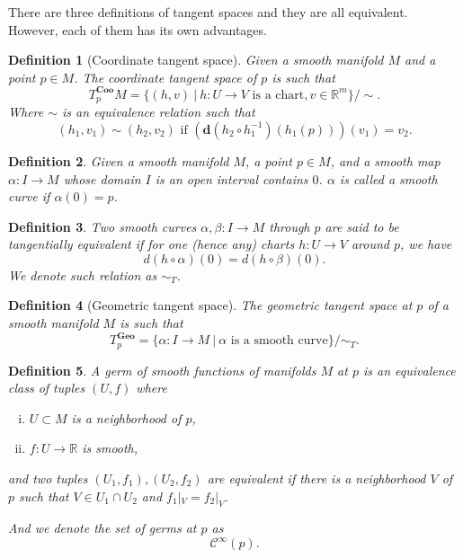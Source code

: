 \documentclass{article}
\newtheorem{definition}{Definition}[section]
\numberwithin{equation}{section}
\begin{document}
There are three definitions of tangent spaces and they are all equivalent. However, each of them has its own advantages. 

\begin{definition}[Coordinate tangent space]
Given a smooth manifold $M$ and a point $p\in M$. The coordinate tangent space of $p$ is such that
\begin{equation*}
T_p^{\mathbf{Coo}}M = \{(h,v)\:|\: h:U\to V\text{ is a chart}, v\in\mathbb{R}^m\}/\sim.
\end{equation*}
Where $\sim$ is an equivalence relation such that
\begin{equation*}
(h_1,v_1)\sim (h_2,v_2)\text{ if } (\mathbf{d}(h_2\circ h_1^{-1})(h_1(p)))(v_1) = v_2.
\end{equation*}
\end{definition}

\begin{definition}
Given a smooth manifold $M$, a point $p\in M$, and a smooth map $\alpha:I\to M$ whose domain $I$ is an open interval contains $0$. $\alpha$ is called a smooth curve if $\alpha(0)=p$.
\end{definition}

\begin{definition}
Two smooth curves $\alpha,\beta:I\to M$ through $p$ are said to be tangentially equivalent if for one (hence any) charts $h:U\to V$ around $p$, we have 
\begin{equation*}
d(h\circ\alpha)(0) = d(h\circ\beta)(0).
\end{equation*}
We denote such relation as $\sim_T$.
\end{definition}

\begin{definition}[Geometric tangent space]
The geometric tangent space at $p$ of a smooth manifold $M$ is such that
\begin{equation*}
T^{\mathbf{Geo}}_p=\{\alpha:I\to M\:|\: \alpha\text{ is a smooth curve}\}/\sim_T.
\end{equation*}
\end{definition}

\begin{definition}
A germ of smooth functions of manifolds $M$ at $p$ is an equivalence class of tuples $(U,f)$ where
\begin{enumerate}[i).]
\item $U\subset M$ is a neighborhood of $p$,
\item $f:U\to\mathbb{R}$ is smooth,
\end{enumerate}
and two tuples $(U_1,f_1),(U_2,f_2)$ are equivalent if there is a neighborhood $V$ of $p$ such that $V\in U_1\cap U_2$ and $f_1|_V=f_2|_V$. \\
\par And we denote the set of germs at $p$ as
\begin{equation*}
\mathcal{C}^\infty(p).
\end{equation*}
\end{definition}
\end{document}
